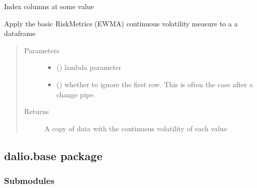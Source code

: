 \documentclass[letterpaper,10pt,english]{sphinxmanual}
\begin{document}
\begin{fulllineitems}
\label{\detokenize{dalio.ops:dalio.ops.index_cols}}
Index columns at some value

\end{fulllineitems}


\begin{fulllineitems}
\label{\detokenize{dalio.ops:dalio.ops.risk_metrics}}
Apply the basic RiskMetrics (EWMA) continuous volatility measure to a
a dataframe
\begin{quote}\begin{description}
\item[{Parameters}] \leavevmode\begin{itemize}
\item {} 
 () \textendash{} lambda parameter

\item {} 
 () \textendash{} whether to ignore the first row. This is often
the case after a change pipe.

\end{itemize}

\item[{Returns}] \leavevmode
A copy of data with the continuous volatility of each value

\end{description}\end{quote}

\end{fulllineitems}



\subsection{dalio.base package}
\label{\detokenize{dalio.base:dalio-base-package}}\label{\detokenize{dalio.base::doc}}

\subsubsection{Submodules}
\label{\detokenize{dalio.base:submodules}}
\end{document}
